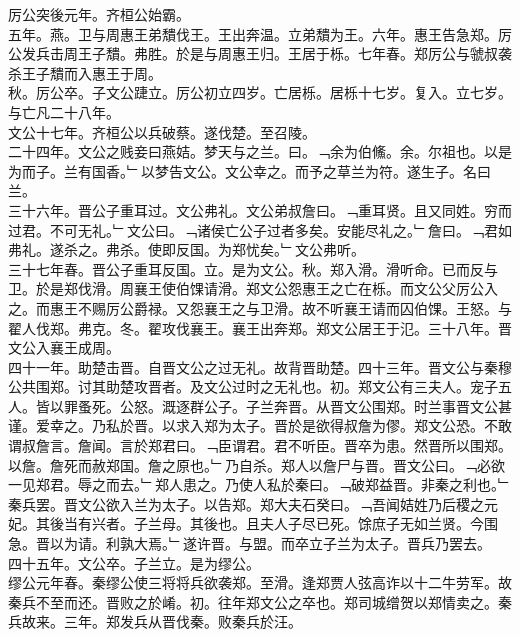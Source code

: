\documentclass{zhvt-classic}
\begin{document}
\hspace*{2em}厉公突後元年。齐桓公始霸。\\
\hspace*{2em}五年。燕。卫与周惠王弟穨伐王。王出奔温。立弟穨为王。六年。惠王告急郑。厉公发兵击周王子穨。弗胜。於是与周惠王归。王居于栎。七年春。郑厉公与虢叔袭杀王子穨而入惠王于周。\\
\hspace*{2em}秋。厉公卒。子文公踕立。厉公初立四岁。亡居栎。居栎十七岁。复入。立七岁。与亡凡二十八年。\\
\hspace*{2em}文公十七年。齐桓公以兵破蔡。遂伐楚。至召陵。\\
\hspace*{2em}二十四年。文公之贱妾曰燕姞。梦天与之兰。曰。﹁余为伯鯈。余。尔祖也。以是为而子。兰有国香。﹂以梦告文公。文公幸之。而予之草兰为符。遂生子。名曰兰。\\
\hspace*{2em}三十六年。晋公子重耳过。文公弗礼。文公弟叔詹曰。﹁重耳贤。且又同姓。穷而过君。不可无礼。﹂文公曰。﹁诸侯亡公子过者多矣。安能尽礼之。﹂詹曰。﹁君如弗礼。遂杀之。弗杀。使即反国。为郑忧矣。﹂文公弗听。\\
\hspace*{2em}三十七年春。晋公子重耳反国。立。是为文公。秋。郑入滑。滑听命。已而反与卫。於是郑伐滑。周襄王使伯馃请滑。郑文公怨惠王之亡在栎。而文公父厉公入之。而惠王不赐厉公爵禄。又怨襄王之与卫滑。故不听襄王请而囚伯馃。王怒。与翟人伐郑。弗克。冬。翟攻伐襄王。襄王出奔郑。郑文公居王于氾。三十八年。晋文公入襄王成周。\\
\hspace*{2em}四十一年。助楚击晋。自晋文公之过无礼。故背晋助楚。四十三年。晋文公与秦穆公共围郑。讨其助楚攻晋者。及文公过时之无礼也。初。郑文公有三夫人。宠子五人。皆以罪蚤死。公怒。溉逐群公子。子兰奔晋。从晋文公围郑。时兰事晋文公甚谨。爱幸之。乃私於晋。以求入郑为太子。晋於是欲得叔詹为僇。郑文公恐。不敢谓叔詹言。詹闻。言於郑君曰。﹁臣谓君。君不听臣。晋卒为患。然晋所以围郑。以詹。詹死而赦郑国。詹之原也。﹂乃自杀。郑人以詹尸与晋。晋文公曰。﹁必欲一见郑君。辱之而去。﹂郑人患之。乃使人私於秦曰。﹁破郑益晋。非秦之利也。﹂秦兵罢。晋文公欲入兰为太子。以告郑。郑大夫石癸曰。﹁吾闻姞姓乃后稷之元妃。其後当有兴者。子兰母。其後也。且夫人子尽已死。馀庶子无如兰贤。今围急。晋以为请。利孰大焉。﹂遂许晋。与盟。而卒立子兰为太子。晋兵乃罢去。\\
\hspace*{2em}四十五年。文公卒。子兰立。是为缪公。\\
\hspace*{2em}缪公元年春。秦缪公使三将将兵欲袭郑。至滑。逢郑贾人弦高诈以十二牛劳军。故秦兵不至而还。晋败之於崤。初。往年郑文公之卒也。郑司城缯贺以郑情卖之。秦兵故来。三年。郑发兵从晋伐秦。败秦兵於汪。\\
\end{document}
